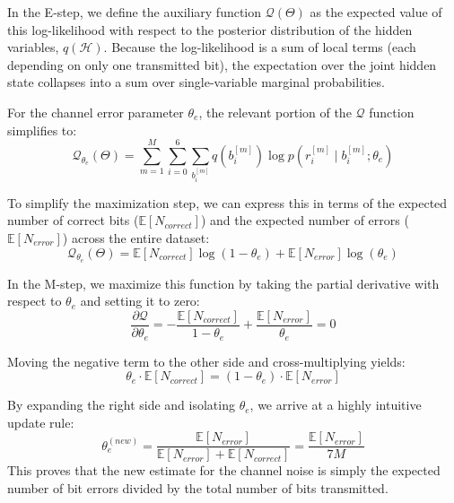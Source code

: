 \documentclass{article}
\begin{document}
In the E-step, we define the auxiliary function $\mathcal{Q}(\Theta)$ as the expected value of this log-likelihood with respect to the posterior distribution of the hidden variables, $q(\mathcal{H})$. Because the log-likelihood is a sum of local terms (each depending on only one transmitted bit), the expectation over the joint hidden state collapses into a sum over single-variable marginal probabilities. 

For the channel error parameter $\theta_e$, the relevant portion of the $\mathcal{Q}$ function simplifies to:
\begin{equation}
    \mathcal{Q}_{\theta_e}(\Theta) = \sum_{m=1}^{M} \sum_{i=0}^{6} \sum_{b_i^{[m]}} q\left(b_i^{[m]}\right) \log p\left(r_i^{[m]} \mid b_i^{[m]}; \theta_e\right)
\end{equation}

To simplify the maximization step, we can express this in terms of the expected number of correct bits ($\mathbb{E}[N_{correct}]$) and the expected number of errors ($\mathbb{E}[N_{error}]$) across the entire dataset:
\begin{equation}
    \mathcal{Q}_{\theta_e}(\Theta) = \mathbb{E}[N_{correct}] \log(1 - \theta_e) + \mathbb{E}[N_{error}] \log(\theta_e)
\end{equation}

In the M-step, we maximize this function by taking the partial derivative with respect to $\theta_e$ and setting it to zero:
\begin{equation}
    \frac{\partial \mathcal{Q}}{\partial \theta_e} = -\frac{\mathbb{E}[N_{correct}]}{1 - \theta_e} + \frac{\mathbb{E}[N_{error}]}{\theta_e} = 0
\end{equation}

Moving the negative term to the other side and cross-multiplying yields:
\begin{equation}
    \theta_e \cdot \mathbb{E}[N_{correct}] = (1 - \theta_e) \cdot \mathbb{E}[N_{error}]
\end{equation}

By expanding the right side and isolating $\theta_e$, we arrive at a highly intuitive update rule:
\begin{equation}
    \theta_e^{(new)} = \frac{\mathbb{E}[N_{error}]}{\mathbb{E}[N_{error}] + \mathbb{E}[N_{correct}]} = \frac{\mathbb{E}[N_{error}]}{7M}
\end{equation}
This proves that the new estimate for the channel noise is simply the expected number of bit errors divided by the total number of bits transmitted.
\end{document}
